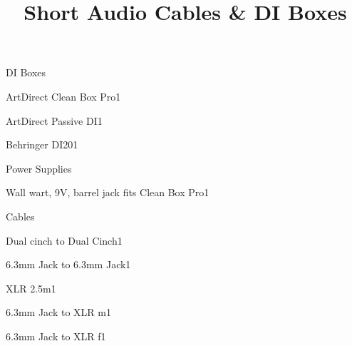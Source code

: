 \def\papersize{5}




\title{Short Audio Cables \& DI Boxes}

\begin{checklist}{DI Boxes}
  \item{ArtDirect Clean Box Pro}{1}
  \item{ArtDirect Passive DI}{1}
  \item{Behringer DI20}{1}
\end{checklist}

\begin{checklist}{Power Supplies}
  \item{Wall wart, 9V, barrel jack fits Clean Box Pro}{1}
\end{checklist}

\begin{checklist}{Cables}
  \item{Dual cinch to Dual Cinch}{1}
  \item{6.3mm Jack to 6.3mm Jack}{1}
  \item{XLR 2.5m}{1}
  \item{6.3mm Jack to XLR m}{1}
  \item{6.3mm Jack to XLR f}{1}
\end{checklist}




